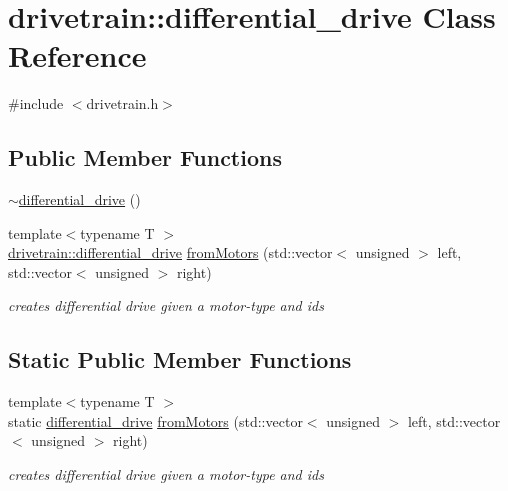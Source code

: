 \hypertarget{classdrivetrain_1_1differential__drive}{}\section{drivetrain\+:\+:differential\+\_\+drive Class Reference}
\label{classdrivetrain_1_1differential__drive}


{\ttfamily \#include $<$drivetrain.\+h$>$}

\subsection*{Public Member Functions}
\begin{DoxyCompactItemize}
\item 
\hyperlink{classdrivetrain_1_1differential__drive_aa3e5198be23957985d8d66504d3394ee}{$\sim$differential\+\_\+drive} ()
\item 
{\footnotesize template$<$typename T $>$ }\\\hyperlink{classdrivetrain_1_1differential__drive}{drivetrain\+::differential\+\_\+drive} \hyperlink{classdrivetrain_1_1differential__drive_a025be9eafc046345e6250861f44d4fb8}{from\+Motors} (std\+::vector$<$ unsigned $>$ left, std\+::vector$<$ unsigned $>$ right)
\begin{DoxyCompactList}\small\item\em creates differential drive given a motor-\/type and ids \end{DoxyCompactList}\end{DoxyCompactItemize}
\subsection*{Static Public Member Functions}
\begin{DoxyCompactItemize}
\item 
{\footnotesize template$<$typename T $>$ }\\static \hyperlink{classdrivetrain_1_1differential__drive}{differential\+\_\+drive} \hyperlink{classdrivetrain_1_1differential__drive_a11a4ba6bf3dce95f830286aaaf77b778}{from\+Motors} (std\+::vector$<$ unsigned $>$ left, std\+::vector$<$ unsigned $>$ right)
\begin{DoxyCompactList}\small\item\em creates differential drive given a motor-\/type and ids \end{DoxyCompactList}\end{DoxyCompactItemize}


